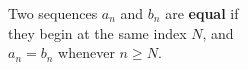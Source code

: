 \documentclass[border=6pt]{standalone}
\begin{document}
\parbox{2.5in}{%
Two sequences $a_n$ and $b_n$ are \textbf{equal} if \\
\null\quad they begin at the same index $N$, and \\
\null\quad $a_n = b_n$ whenever $n \geq N$.}
\end{document}
